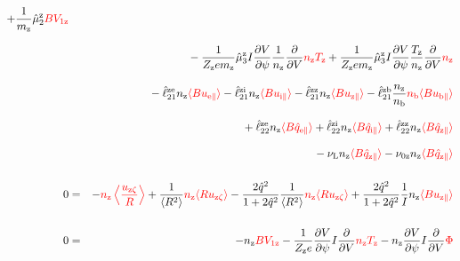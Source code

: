 \documentclass[11pt]{article}
\def\r#1{{\rm#1}}
\def\ave#1{\left\langle#1\right\rangle}
\def\aves#1{\langle#1\rangle}
\def\dd#1#2{\frac{\partial #1}{\partial #2}}
\def\para{\parallel}
\def\ddV{\frac{\partial}{\partial V}}
\def\mz{m_\r{z}}
\def\nz{n_\r{z}}
\def\nb{n_\r{b}}
\def\Tz{T_\r{z}}
\def\Zz{Z_\r{z}}
\def\uzt#1{u_{\r{#1}\zeta}}
\def\upara#1{u_{\r{#1}\para}}
\def\qhatpara#1{\hat{q}_{\r{#1}\para}}
\def\nun#1{\nu_\r{0#1}}
\def\nuL{\nu_\r{L}}
\def\red#1{\textcolor{red}{#1}}
\begin{document}
\begin{eqnarray}
%
  + \frac{1}{\mz} \hat{\mu}_2^\r{z} \red{B V_{1\r{z}}}
\nonumber\\[3mm]&&{}
%
  - \frac{1}{\Zz e\mz} \hat{\mu}_3^\r{z} I \dd{V}{\psi} \frac{1}{\nz}
  \ddV \red{\nz\Tz}
  + \frac{1}{\Zz e\mz} \hat{\mu}_3^\r{z} I \dd{V}{\psi} \frac{\Tz}{\nz}
  \ddV \red{\nz}
\nonumber\\[3mm]&&{}
%
  - \hat{\ell}_{21}^{\r{ze}} \nz \red{\aves{B \upara{e}}} 
  - \hat{\ell}_{21}^{\r{zi}} \nz \red{\aves{B \upara{i}}} 
  - \hat{\ell}_{21}^{\r{zz}} \nz \red{\aves{B \upara{z}}} 
  - \hat{\ell}_{21}^{\r{zb}} \frac{\nz}{\nb} \red{\nb \aves{B \upara{b}}} 
\nonumber\\[3mm]&&{}
%
  + \hat{\ell}_{22}^{\r{ze}} \nz \red{\aves{B \qhatpara{e}}} 
  + \hat{\ell}_{22}^{\r{zi}} \nz \red{\aves{B \qhatpara{i}}} 
  + \hat{\ell}_{22}^{\r{zz}} \nz \red{\aves{B \qhatpara{z}}} 
\nonumber\\[3mm]&&{}
%
  - \nuL \nz \red{\aves{B \qhatpara{z}}}
%
  - \nun{z} \nz \red{\aves{B \qhatpara{z}}}
\\[5mm]
  0 &=&
%
  - \red{\nz \ave{\frac{\uzt{z}}{R}}}
%
  + \frac{1}{\aves{R^2}} \red{\nz \aves{R\uzt{z}}}
%
  - \frac{2\hat{q}^2}{1+2\hat{q}^2} \frac{1}{\aves{R^2}}\red{\nz\aves{R\uzt{z}}}
%
  + \frac{2\hat{q}^2}{1+2\hat{q}^2} \frac{1}{I}\nz \red{\aves{B\upara{z}}}
\\[5mm]
    0 &=&
%
  - \nz \red{BV_{1\r{z}}}
%
  - \frac{1}{\Zz e} \dd{V}{\psi} I \ddV \red{\nz\Tz}
%
  - \nz \dd{V}{\psi} I \ddV \red{\Phi}
\end{eqnarray}
%

\clearpage
\end{document}
